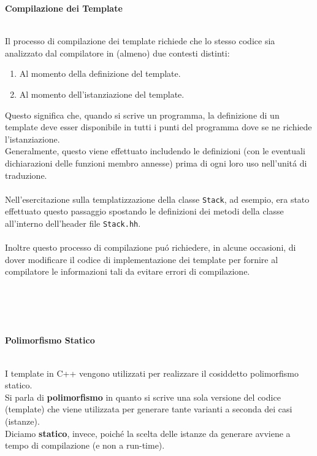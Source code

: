 \documentclass{article}
\begin{document}
\begin{large}\textbf{\textcolor{blu}{Compilazione dei Template}} \\ \\\end{large}
Il processo di compilazione dei template richiede che lo stesso codice sia analizzato dal compilatore in (almeno) due contesti distinti:
\begin{enumerate}
\item Al momento della definizione del template.
\item Al momento dell'istanziazione del template.
\end{enumerate}
Questo significa che, quando si scrive un programma, la definizione di un template deve esser disponibile in tutti i punti del programma dove se ne richiede l'istanziazione.\\Generalmente, questo viene effettuato includendo le definizioni (con le eventuali dichiarazioni delle funzioni membro annesse) prima di ogni loro uso nell'unit\'a di traduzione.\\ \\Nell'esercitazione sulla templatizzazione della classe \texttt{Stack}, ad esempio, era stato effettuato questo passaggio spostando le definizioni dei metodi della classe all'interno dell'header file \texttt{Stack.hh}.\\ \\ Inoltre questo processo di compilazione pu\'o richiedere, in alcune occasioni, di dover modificare il codice di implementazione dei template per fornire al compilatore le informazioni tali da evitare errori di compilazione.
\\ \\ \\ \\ \\
\begin{large}\textbf{\textcolor{blu}{Polimorfismo Statico}} \\ \\ \end{large}
I template in C++ vengono utilizzati per realizzare il cosiddetto polimorfismo statico.\\
Si parla di \textbf{polimorfismo} in quanto si scrive una sola versione del codice (template) che viene utilizzata per generare tante varianti a seconda dei casi (istanze).\\Diciamo \textbf{statico}, invece, poich\'e la scelta delle istanze da generare avviene a tempo di compilazione (e non a run-time).
\end{document}
